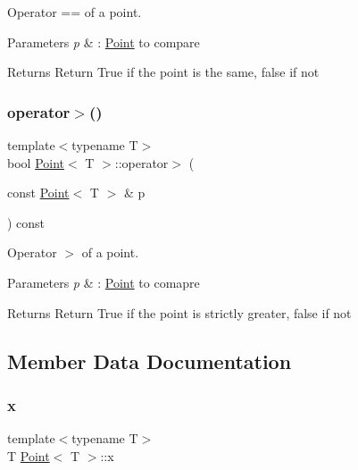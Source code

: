 Operator == of a point. 


\begin{DoxyParams}{Parameters}
{\em p} & \+: \hyperlink{classPoint}{Point} to compare \\
\hline
\end{DoxyParams}
\begin{DoxyReturn}{Returns}
Return True if the point is the same, false if not 
\end{DoxyReturn}
\mbox{\label{classPoint_acc5ef36d8fd82f6034ec4764f7c7cbf8}} 
\subsubsection{\texorpdfstring{operator$>$()}{operator>()}}
{\footnotesize\ttfamily template$<$typename T$>$ \\
bool \hyperlink{classPoint}{Point}$<$ T $>$\+::operator$>$ (\begin{DoxyParamCaption}\item[{const \hyperlink{classPoint}{Point}$<$ T $>$ \&}]{p }\end{DoxyParamCaption}) const\hspace{0.3cm}{\ttfamily [inline]}}



Operator $>$ of a point. 


\begin{DoxyParams}{Parameters}
{\em p} & \+: \hyperlink{classPoint}{Point} to comapre \\
\hline
\end{DoxyParams}
\begin{DoxyReturn}{Returns}
Return True if the point is strictly greater, false if not 
\end{DoxyReturn}


\subsection{Member Data Documentation}
\mbox{\label{classPoint_a401d07562afaf0079121218025e66b76}} 
\subsubsection{\texorpdfstring{x}{x}}
{\footnotesize\ttfamily template$<$typename T$>$ \\
T \hyperlink{classPoint}{Point}$<$ T $>$\+::x}

